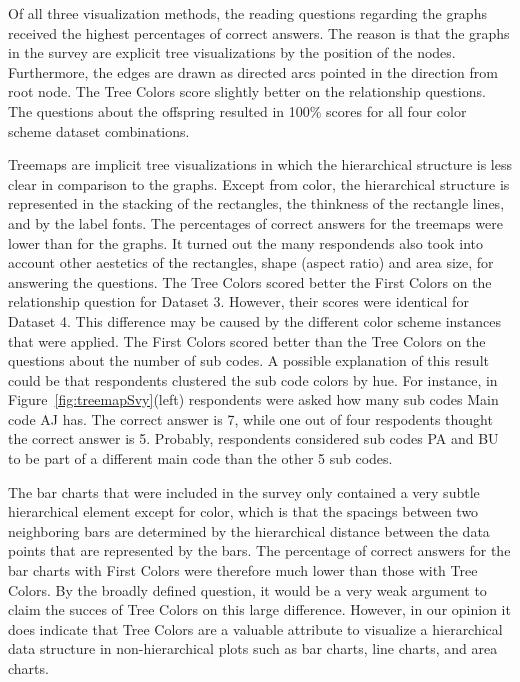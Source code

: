 \documentclass[journal]{vgtc}                %
\begin{document}
Of all three visualization methods, the reading questions regarding the graphs received the highest percentages of correct answers. The reason is that the graphs in the survey are explicit tree visualizations by the position of the nodes. Furthermore, the edges are drawn as directed arcs pointed in the direction from root node. The Tree Colors score slightly better on the relationship questions. The questions about the offspring resulted in 100\% scores for all four color scheme dataset combinations.

Treemaps are implicit tree visualizations in which the hierarchical structure is less clear in comparison to the graphs. Except from color, the hierarchical structure is represented in the stacking of the rectangles, the thinkness of the rectangle lines, and by the label fonts. The percentages of correct answers for the treemaps were lower than for the graphs. It turned out the many respondends also took into account other aestetics of the rectangles, shape (aspect ratio) and area size, for answering the questions. The Tree Colors scored better the First Colors on the relationship question for Dataset 3. However, their scores were identical for Dataset 4. This difference may be caused by the different color scheme instances that were applied. The First Colors scored better than the Tree Colors on the questions about the number of sub codes. A possible explanation of this result could be that respondents clustered the sub code colors by hue. For instance, in Figure~\ref{fig:treemapSvy}(left) respondents were asked how many sub codes Main code AJ has. The correct answer is 7, while one out of four respodents thought the correct answer is 5. Probably, respondents considered sub codes PA and BU to be part of a different main code than the other 5 sub codes.

The bar charts that were included in the survey only contained a very subtle hierarchical element except for color, which is that the spacings between two neighboring bars are determined by the hierarchical distance between the data points that are represented by the bars. The percentage of correct answers for the bar charts with First Colors were therefore much lower than those with Tree Colors. By the broadly defined question, it would be a very weak argument to claim the succes of Tree Colors on this large difference. However, in our opinion it does indicate that Tree Colors are a valuable attribute to visualize a hierarchical data structure in non-hierarchical plots such as bar charts, line charts, and area charts.
\end{document}

